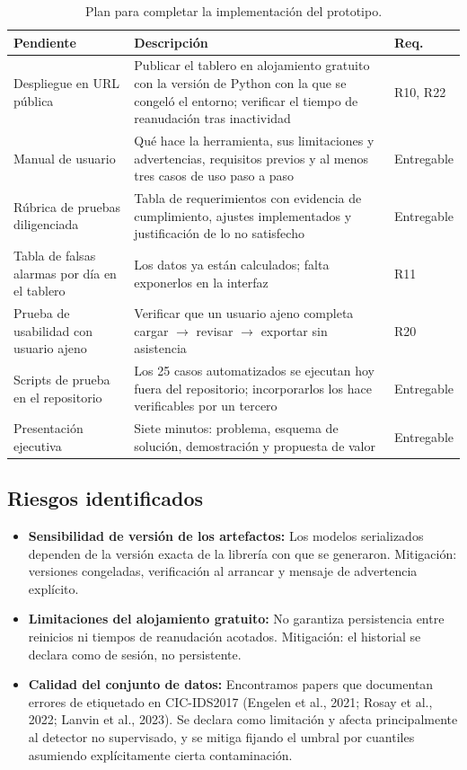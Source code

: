 \documentclass[11pt,a4paper]{article}
\begin{document}
\begin{table}[H]
\centering
\caption{Plan para completar la implementación del prototipo.}
\label{tab:plan}
\footnotesize\setlength{\tabcolsep}{4pt}
\begin{tabular}{L{4.2cm} L{7.4cm} L{2.2cm}}
\toprule
\textbf{Pendiente} & \textbf{Descripción} & \textbf{Req.} \\
\midrule
Despliegue en URL pública & Publicar el tablero en alojamiento gratuito con la versión de Python con la que se congeló el entorno; verificar el tiempo de reanudación tras inactividad & R10, R22 \\
Manual de usuario & Qué hace la herramienta, sus limitaciones y advertencias, requisitos previos y al menos tres casos de uso paso a paso & Entregable \\
Rúbrica de pruebas diligenciada & Tabla de requerimientos con evidencia de cumplimiento, ajustes implementados y justificación de lo no satisfecho & Entregable \\
Tabla de falsas alarmas por día en el tablero & Los datos ya están calculados; falta exponerlos en la interfaz & R11 \\
Prueba de usabilidad con usuario ajeno & Verificar que un usuario ajeno completa cargar $\rightarrow$ revisar $\rightarrow$ exportar sin asistencia & R20 \\
Scripts de prueba en el repositorio & Los 25 casos automatizados se ejecutan hoy fuera del repositorio; incorporarlos los hace verificables por un tercero & Entregable \\
Presentación ejecutiva & Siete minutos: problema, esquema de solución, demostración y propuesta de valor & Entregable \\
\bottomrule
\end{tabular}
\end{table}

\subsection{Riesgos identificados}

\begin{itemize}
\item \textbf{Sensibilidad de versión de los artefactos:} Los modelos
serializados dependen de la versión exacta de la librería con que se
generaron. Mitigación: versiones congeladas, verificación al arrancar y
mensaje de advertencia explícito.
\item \textbf{Limitaciones del alojamiento gratuito:} No garantiza
persistencia entre reinicios ni tiempos de reanudación acotados. Mitigación:
el historial se declara como de sesión, no persistente.
\item \textbf{Calidad del conjunto de datos:} Encontramos papers que documentan errores
de etiquetado en CIC-IDS2017 (Engelen et al., 2021; Rosay et al., 2022;
Lanvin et al., 2023). Se declara como limitación y afecta
principalmente al detector no supervisado, y se mitiga fijando el umbral por
cuantiles asumiendo explícitamente cierta contaminación.
\end{itemize}
\end{document}
